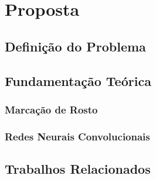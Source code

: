 \chapter{Proposta}

\section{Definição do Problema}

\section{Fundamentação Teórica}

\subsection{Marcação de Rosto}
\label{sec:faciallm}

\subsection{Redes Neurais Convolucionais}
\label{sec:3dcnn}

\section{Trabalhos Relacionados}
